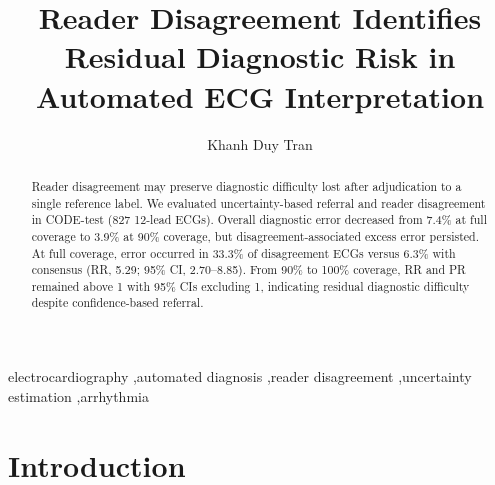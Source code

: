 \documentclass[5p,times,twocolumn]{elsarticle}
\begin{document}
\begin{frontmatter}

\title{Reader Disagreement Identifies Residual Diagnostic Risk in Automated ECG Interpretation}

\author[iu]{Khanh Duy Tran}

\address[iu]{School of Electrical Engineering, International University -- Vietnam National University, Ho Chi Minh City, Vietnam}


\begin{abstract}
Reader disagreement may preserve diagnostic difficulty lost after adjudication
to a single reference label. We evaluated uncertainty-based referral and reader
disagreement in CODE-test (827 12-lead ECGs). Overall diagnostic error decreased
from 7.4\% at full coverage to 3.9\% at 90\% coverage, but
disagreement-associated excess error persisted. At full coverage, error occurred
in 33.3\% of disagreement ECGs versus 6.3\% with consensus (RR, 5.29; 95\% CI,
2.70--8.85). From 90\% to 100\% coverage, RR and PR remained above 1 with 95\%
CIs excluding 1, indicating residual diagnostic difficulty despite
confidence-based referral.
\end{abstract}

\begin{keyword}
electrocardiography \sep automated diagnosis \sep reader disagreement \sep uncertainty estimation \sep arrhythmia
\end{keyword}

\end{frontmatter}


\section{Introduction}
\end{document}
